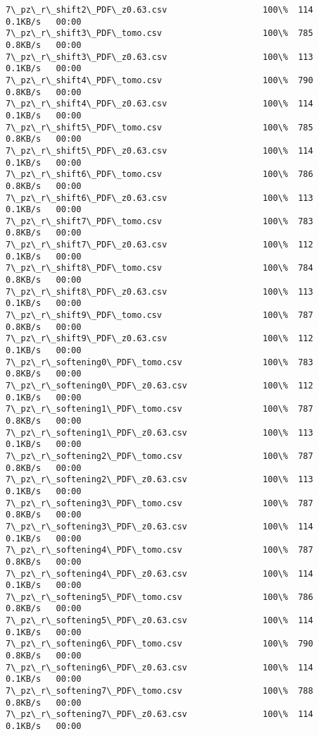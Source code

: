 \documentclass[11pt]{article}
\begin{document}
\begin{Verbatim}[commandchars=\\\{\}]
7\_pz\_r\_shift2\_PDF\_z0.63.csv                   100\%  114     0.1KB/s   00:00    
7\_pz\_r\_shift3\_PDF\_tomo.csv                    100\%  785     0.8KB/s   00:00    
7\_pz\_r\_shift3\_PDF\_z0.63.csv                   100\%  113     0.1KB/s   00:00    
7\_pz\_r\_shift4\_PDF\_tomo.csv                    100\%  790     0.8KB/s   00:00    
7\_pz\_r\_shift4\_PDF\_z0.63.csv                   100\%  114     0.1KB/s   00:00    
7\_pz\_r\_shift5\_PDF\_tomo.csv                    100\%  785     0.8KB/s   00:00    
7\_pz\_r\_shift5\_PDF\_z0.63.csv                   100\%  114     0.1KB/s   00:00    
7\_pz\_r\_shift6\_PDF\_tomo.csv                    100\%  786     0.8KB/s   00:00    
7\_pz\_r\_shift6\_PDF\_z0.63.csv                   100\%  113     0.1KB/s   00:00    
7\_pz\_r\_shift7\_PDF\_tomo.csv                    100\%  783     0.8KB/s   00:00    
7\_pz\_r\_shift7\_PDF\_z0.63.csv                   100\%  112     0.1KB/s   00:00    
7\_pz\_r\_shift8\_PDF\_tomo.csv                    100\%  784     0.8KB/s   00:00    
7\_pz\_r\_shift8\_PDF\_z0.63.csv                   100\%  113     0.1KB/s   00:00    
7\_pz\_r\_shift9\_PDF\_tomo.csv                    100\%  787     0.8KB/s   00:00    
7\_pz\_r\_shift9\_PDF\_z0.63.csv                   100\%  112     0.1KB/s   00:00    
7\_pz\_r\_softening0\_PDF\_tomo.csv                100\%  783     0.8KB/s   00:00    
7\_pz\_r\_softening0\_PDF\_z0.63.csv               100\%  112     0.1KB/s   00:00    
7\_pz\_r\_softening1\_PDF\_tomo.csv                100\%  787     0.8KB/s   00:00    
7\_pz\_r\_softening1\_PDF\_z0.63.csv               100\%  113     0.1KB/s   00:00    
7\_pz\_r\_softening2\_PDF\_tomo.csv                100\%  787     0.8KB/s   00:00    
7\_pz\_r\_softening2\_PDF\_z0.63.csv               100\%  113     0.1KB/s   00:00    
7\_pz\_r\_softening3\_PDF\_tomo.csv                100\%  787     0.8KB/s   00:00    
7\_pz\_r\_softening3\_PDF\_z0.63.csv               100\%  114     0.1KB/s   00:00    
7\_pz\_r\_softening4\_PDF\_tomo.csv                100\%  787     0.8KB/s   00:00    
7\_pz\_r\_softening4\_PDF\_z0.63.csv               100\%  114     0.1KB/s   00:00    
7\_pz\_r\_softening5\_PDF\_tomo.csv                100\%  786     0.8KB/s   00:00    
7\_pz\_r\_softening5\_PDF\_z0.63.csv               100\%  114     0.1KB/s   00:00    
7\_pz\_r\_softening6\_PDF\_tomo.csv                100\%  790     0.8KB/s   00:00    
7\_pz\_r\_softening6\_PDF\_z0.63.csv               100\%  114     0.1KB/s   00:00    
7\_pz\_r\_softening7\_PDF\_tomo.csv                100\%  788     0.8KB/s   00:00    
7\_pz\_r\_softening7\_PDF\_z0.63.csv               100\%  114     0.1KB/s   00:00    

\end{Verbatim}
\end{document}
